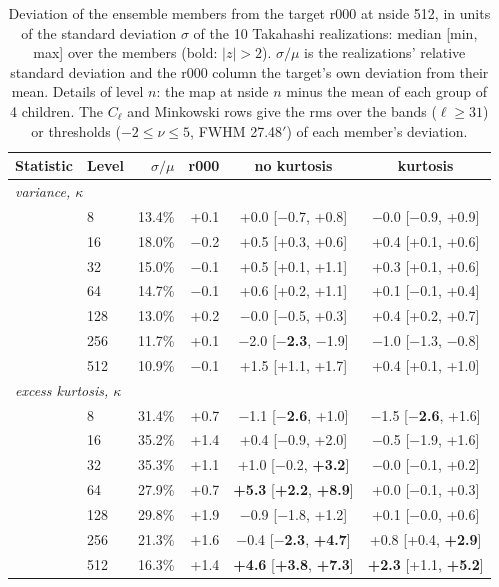 \begin{table}
\caption{Deviation of the ensemble members from the target r000 at nside 512, in units of the standard deviation $\sigma$ of the 10 Takahashi realizations: median [min, max] over the members (bold: $|z| > 2$). $\sigma/\mu$ is the realizations' relative standard deviation and the r000 column the target's own deviation from their mean. Details of level $n$: the map at nside $n$ minus the mean of each group of 4 children. The $C_\ell$ and Minkowski rows give the rms over the bands ($\ell \geq 31$) or thresholds ($-2\leq\nu\leq5$, FWHM 27.48$'$) of each member's deviation.}
\label{tab:zscores_n512}
\centering\small
\begin{tabular}{llrrcc}
\hline\hline
Statistic & Level & $\sigma/\mu$ & r000 & no kurtosis & kurtosis \\
\hline
\multicolumn{6}{l}{\emph{variance, $\kappa$}} \\
 & 8 & 13.4\% & +0.1 & +0.0 [$-$0.7, +0.8] & $-$0.0 [$-$0.9, +0.9] \\
 & 16 & 18.0\% & $-$0.2 & +0.5 [+0.3, +0.6] & +0.4 [+0.1, +0.6] \\
 & 32 & 15.0\% & $-$0.1 & +0.5 [+0.1, +1.1] & +0.3 [+0.1, +0.6] \\
 & 64 & 14.7\% & $-$0.1 & +0.6 [+0.2, +1.1] & +0.1 [$-$0.1, +0.4] \\
 & 128 & 13.0\% & +0.2 & $-$0.0 [$-$0.5, +0.3] & +0.4 [+0.2, +0.7] \\
 & 256 & 11.7\% & +0.1 & $-$2.0 [\textbf{$-$2.3}, $-$1.9] & $-$1.0 [$-$1.3, $-$0.8] \\
 & 512 & 10.9\% & $-$0.1 & +1.5 [+1.1, +1.7] & +0.4 [+0.1, +1.0] \\
\hline
\multicolumn{6}{l}{\emph{excess kurtosis, $\kappa$}} \\
 & 8 & 31.4\% & +0.7 & $-$1.1 [\textbf{$-$2.6}, +1.0] & $-$1.5 [\textbf{$-$2.6}, +1.6] \\
 & 16 & 35.2\% & +1.4 & +0.4 [$-$0.9, +2.0] & $-$0.5 [$-$1.9, +1.6] \\
 & 32 & 35.3\% & +1.1 & +1.0 [$-$0.2, \textbf{+3.2}] & $-$0.0 [$-$0.1, +0.2] \\
 & 64 & 27.9\% & +0.7 & \textbf{+5.3} [\textbf{+2.2}, \textbf{+8.9}] & +0.0 [$-$0.1, +0.3] \\
 & 128 & 29.8\% & +1.9 & $-$0.9 [$-$1.8, +1.2] & +0.1 [$-$0.0, +0.6] \\
 & 256 & 21.3\% & +1.6 & $-$0.4 [\textbf{$-$2.3}, \textbf{+4.7}] & +0.8 [+0.4, \textbf{+2.9}] \\
 & 512 & 16.3\% & +1.4 & \textbf{+4.6} [\textbf{+3.8}, \textbf{+7.3}] & \textbf{+2.3} [+1.1, \textbf{+5.2}] \\

\end{tabular}
\end{table}
